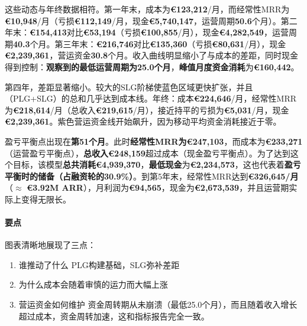 \documentclass[11点, A4纸, 单面]{article}
\begin{document}
这些动态与年终数据相符。第一年末，成本为\textbf{€123{,}212}/月，而经常性MRR为\textbf{€10{,}948}/月（亏损\textbf{€112{,}149}/月，现金\textbf{€5{,}740{,}147}，运营周期\textbf{50.6}个月）。第二年末：\textbf{€154{,}413}对比\textbf{€53{,}194}（亏损\textbf{€100{,}855}/月），现金\textbf{€4{,}282{,}549}，运营周期\textbf{40.3}个月。第三年末：\textbf{€216{,}746}对比\textbf{€135{,}360}（亏损\textbf{€80{,}631}/月），现金\textbf{€2{,}239{,}361}，营运资金\textbf{30.8}个月。收入曲线明显缩小了与成本的差距，同时现金得到控制：\textbf{观察到的最低运营周期为25.0个月}，\textbf{峰值月度资金消耗}为\textbf{€160{,}442}。

第四年，差距显著缩小。较大的SLG阶梯使蓝色区域更快扩张，并且（PLG+SLG）的总和几乎达到成本线。年终：成本\textbf{€224{,}646}/月，经常性MRR为\textbf{€218{,}614}/月（总收入\textbf{€219{,}615}/月），接近持平的亏损为\textbf{€5{,}031}/月，现金\textbf{€2{,}239{,}361}。紫色营运资金线开始飙升，因为移动平均资金消耗接近于零。



盈亏平衡点出现在\textbf{第51个月}。此时\textbf{经常性MRR为€247{,}103}，而成本为\textbf{€233{,}271}（运营盈亏平衡点），\textbf{总收入€248{,}159}超过成本（现金盈亏平衡点）。为了达到这个目标，该模型\textbf{总共消耗€4{,}939{,}370}，\textbf{最低现金}为\textbf{€2{,}234{,}573}，这也代表着\textbf{盈亏平衡时的储备（占融资轮的30.9\%）}。到第5年末，经常性MRR达到\textbf{€326{,}645/月}（$\approx$ \textbf{€3.92M ARR}），月利润为\textbf{€94{,}565}，现金为\textbf{€2{,}673{,}539}，并且运营期实际上变得无限长。

\paragraph{要点}
图表清晰地展现了三点：
\begin{enumerate}
\item 谁推动了什么 PLG构建基础，SLG弥补差距
\item 为什么成本会随着审慎的运力而大幅上涨
\item 营运资金如何维护 资金周转期从未崩溃（最低25.0个月），而且随着收入增长超过成本，资金周转加速，这和指标报告完全一致。
\end{enumerate}
\end{document}
